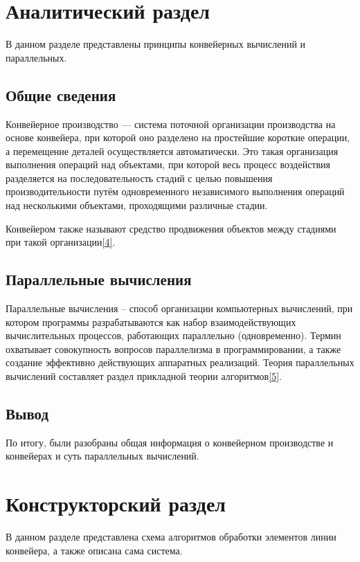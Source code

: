 \documentclass[14pt, a4paper]{extarticle}
\begin{document}
	\clearpage
	\section{Аналитический раздел}
	В данном разделе представлены принципы конвейерных вычислений и параллельных.
	
	\subsection{Общие сведения}
	Конвейерное производство — система поточной организации производства на основе конвейера, при которой оно разделено на простейшие короткие операции, а перемещение деталей осуществляется автоматически. Это такая организация выполнения операций над объектами, при которой весь процесс воздействия разделяется на последовательность стадий с целью повышения производительности путём одновременного независимого выполнения операций над несколькими объектами, проходящими различные стадии.
	
	Конвейером также называют средство продвижения объектов между стадиями при такой организации\hyperref[Conveyer]{[4]}.
	
	\subsection{Параллельные вычисления}
	Параллельные вычисления – способ организации компьютерных вычислений, при котором программы разрабатываются как набор взаимодействующих вычислительных процессов, работающих параллельно (одновременно). Термин охватывает совокупность вопросов параллелизма в программировании, а также создание эффективно действующих аппаратных реализаций. Теория параллельных вычислений составляет раздел прикладной теории алгоритмов\hyperref[ParInfo]{[5]}.
	
	
	\subsection*{Вывод}
	По итогу, были разобраны общая информация о конвейерном производстве и конвейерах и суть параллельных вычислений.
	
	\section{Конструкторский раздел}
	В данном разделе представлена схема алгоритмов обработки элементов линии конвейера, а также описана сама система.
\end{document}
